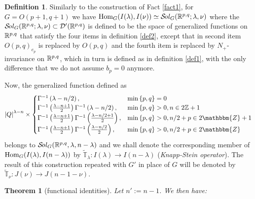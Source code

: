\documentclass[12pt]{article} %
\newtheorem{theorem}{Theorem}
\newcommand{\Hom}{\mbox{\normalfont Hom}}
\newcommand{\Sol}{\mathcal{S}\!{\it ol}}
\theoremstyle{definition}
\newtheorem{definition}{Definition}
\theoremstyle{exampstyle} \newtheorem{examp}[theorem]{Theorem}
\begin{document}
	\begin{definition}
		Similarly to the construction of Fact \ref{fact1}, for $G=O(p+1,q+1)$ we have $\Hom_G(I(\lambda),I(\nu))\simeq\Sol_G(\R^{p,q};\lambda,\nu)$
		where the $\Sol_G(\R^{p,q};\lambda,\nu)\subset\mathcal{D}'(\R^{p,q})$ is defined to be the space of generalized functions on $\mathbb{R}^{p,q}$ that satisfy
		the four items in definition \ref{def2}, except that in second item $O(p,q)_{e_p}$ is replaced by $O(p,q)$ and the fourth item is replaced by $N_+$-invariance
		on $\mathbb{R}^{p,q}$, which in turn is defined as in definition \ref{def1}, with the only difference that we do not assume $b_p=0$ anymore.

		Now, the generalized function defined as
		\begin{equation*}
			\myabs{Q}^{\lambda-n}\times\begin{cases}
				\Gamma^{-1}\left( \lambda-n/2 \right),&\min\left\{ p,q \right\}=0\\
				\Gamma^{-1}\left( \frac{\lambda-n+1}{2} \right)\Gamma^{-1}\left( \lambda-n/2 \right),&\min\left\{ p,q \right\}>0,n\in2\Z+1\\
  \Gamma^{-1} \left( \frac{\lambda-n + 1}{2} \right) \Gamma ^{-1}\left( \frac{\lambda-n/2+
  1}{2} \right), &\min\left\{ p,q \right\}>0, n / 2 + p \in 2\mathbbm{Z}+ 1\\
  \Gamma^{-1} \left( \frac{\lambda-n + 1}{2} \right) \Gamma ^{-1}\left( \frac{\lambda-n/2}{2}
  \right), & \min\left\{ p,q \right\}>0,n / 2 + p \in 2\mathbbm{Z}
			\end{cases}
		\end{equation*}
		belongs to $\Sol_G(\R^{p,q},\lambda,n-\lambda)$ and we shall denote the corresponding member of $\Hom_{G}(I(\lambda),I(n-\lambda))$ by $\tilde{\mathbb{T}}_{\lambda}:I(\lambda)\to
		I(n-\lambda)$
		(\textit{Knapp-Stein operator}).
		The result of this construction repeated with $G'$ in place of $G$ will be denoted by $\tilde{\mathbb{T}}_\nu:J(\nu)\to J(n-1-\nu)$.
	\end{definition}
	\begin{theorem}[functional identities]
		Let $n':=n-1$. We then have:
	\end{theorem}
\end{document}

